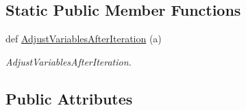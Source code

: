 \subsection*{Static Public Member Functions}
\begin{DoxyCompactItemize}
\item 
def \hyperlink{classSignalIntegrity_1_1Fit_1_1LevMar_1_1LevMar_a4e9e41b9d341c6749d784fb67271ccdd}{Adjust\+Variables\+After\+Iteration} (a)
\begin{DoxyCompactList}\small\item\em Adjust\+Variables\+After\+Iteration. \end{DoxyCompactList}\end{DoxyCompactItemize}
\subsection*{Public Attributes}
